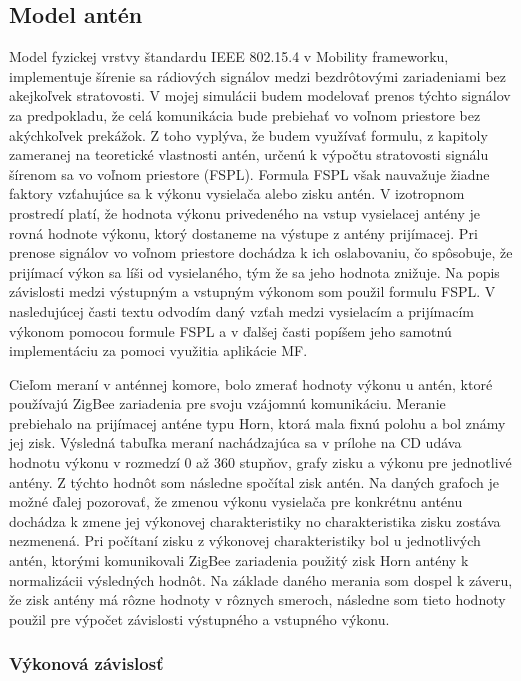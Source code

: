 \documentclass[11pt,twoside,a4paper]{book}
\begin{document}
\subsection{Model antén}
Model fyzickej vrstvy štandardu IEEE 802.15.4 v Mobility frameworku, implementuje šírenie sa rádiových signálov medzi bezdrôtovými zariadeniami bez akejkoľvek stratovosti. V mojej simulácii budem modelovať prenos týchto signálov za predpokladu, že celá komunikácia bude prebiehať vo voľnom priestore bez akýchkoľvek prekážok. Z toho vyplýva, že budem využívať formulu, z kapitoly zameranej na teoretické vlastnosti antén, určenú k výpočtu stratovosti signálu šírenom sa vo voľnom priestore (FSPL). Formula FSPL však nauvažuje žiadne faktory vzťahujúce sa k výkonu vysielača alebo zisku antén. V izotropnom prostredí platí, že hodnota výkonu privedeného na vstup vysielacej antény je rovná hodnote výkonu, ktorý dostaneme na výstupe z antény prijímacej. Pri prenose signálov vo voľnom priestore dochádza k ich oslabovaniu, čo spôsobuje, že prijímací výkon sa líši od vysielaného, tým že sa jeho hodnota znižuje. Na popis závislosti medzi výstupným a vstupným výkonom som použil formulu FSPL. V nasledujúcej časti textu odvodím daný vzťah medzi vysielacím a prijímacím výkonom pomocou formule FSPL a v ďalšej časti popíšem jeho samotnú implementáciu za pomoci využitia aplikácie MF.

Cieľom meraní v anténnej komore, bolo zmerať hodnoty výkonu u antén, ktoré používajú ZigBee zariadenia pre svoju vzájomnú komunikáciu. Meranie prebiehalo na prijímacej anténe typu Horn, ktorá mala fixnú polohu a bol známy jej zisk. Výsledná tabuľka meraní nachádzajúca sa v prílohe na CD udáva hodnotu výkonu v rozmedzí 0 až 360 stupňov, grafy zisku a výkonu pre jednotlivé antény. Z týchto hodnôt som následne spočítal zisk antén. Na daných grafoch je možné ďalej pozorovať, že zmenou výkonu vysielača pre konkrétnu anténu dochádza k zmene jej výkonovej charakteristiky no charakteristika zisku zostáva nezmenená. %
Pri počítaní zisku z výkonovej charakteristiky bol u jednotlivých antén, ktorými komunikovali ZigBee zariadenia použitý zisk Horn antény k normalizácii výsledných hodnôt. Na základe daného merania som dospel k záveru, že zisk antény má rôzne hodnoty v rôznych smeroch, následne som tieto hodnoty použil pre výpočet závislosti výstupného a vstupného výkonu.

\subsubsection{Výkonová závislosť}
\end{document}
